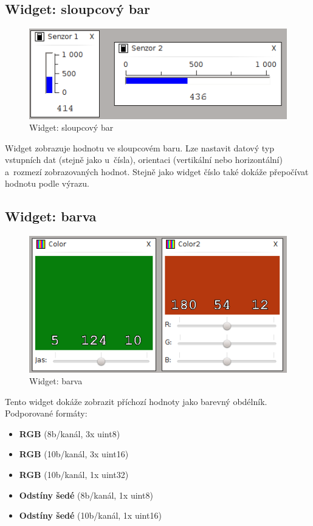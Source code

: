 \documentclass[12pt, a4paper, oneside]{article}
\begin{document}
\subsection{Widget: sloupcový bar}
\begin{figure}[H]
\begin{center}
\includegraphics{img/w_bar.png}
\caption{Widget: sloupcový bar}
\end{center}
\end{figure}
Widget zobrazuje hodnotu ve sloupcovém baru. Lze nastavit datový typ vstupních dat (stejně jako u~čísla), orientaci (vertikální nebo horizontální) a~rozmezí zobrazovaných hodnot. Stejně jako widget číslo také dokáže přepočívat hodnotu podle výrazu.

\subsection{Widget: barva}
\begin{figure}[H]
\begin{center}
\includegraphics{img/w_col.png}
\caption{Widget: barva}
\end{center}
\end{figure}
Tento widget dokáže zobrazit příchozí hodnoty jako barevný obdélník. Podporované formáty:
\begin{itemize}
    \item {\bf RGB} (8b/kanál, 3x uint8)
    \item {\bf RGB} (10b/kanál, 3x uint16)
    \item {\bf RGB} (10b/kanál, 1x uint32)
    \item {\bf Odstíny šedé} (8b/kanál, 1x uint8)
    \item {\bf Odstíny šedé} (10b/kanál, 1x uint16)
\end{itemize}
\end{document}
